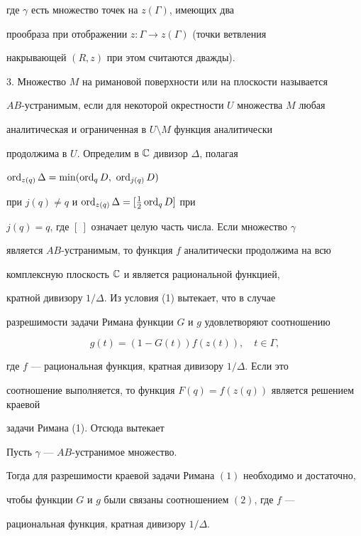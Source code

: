 где $\gamma$ есть множество точек на $z(\Gamma)$, имеющих два


прообраза при отображении $z: \Gamma \to z(\Gamma)$ (точки ветвления


накрывающей $(R, z)$ при этом считаются дважды).





3. Множество $M$ на римановой поверхности или на плоскости называется


$AB$-устранимым, если для некоторой окрестности $U$ множества $M$ любая


аналитическая и ограниченная в $U\setminus M$ функция аналитически


продолжима в $U$. Определим в $\Bbb C$ дивизор $\Delta$, полагая


$\ord_{z(q)}\Delta =\min (\ord_qD,\ \ord_{j(q)}D)$


при $j(q)\ne q$ и $\operatorname{ord}_{z(q)}\Delta =[\frac12\operatorname{ord}_qD]$ при


$j(q)=q$, где $[\ ]$ означает целую часть числа. Если множество $\gamma$


является $AB$-устранимым, то функция $f$ аналитически продолжима на всю


комплексную плоскость $\Bbb C$ и является рациональной функцией,


кратной дивизору $1/\Delta$. Из условия (1) вытекает, что в случае


разрешимости задачи Римана функции $G$ и $g$ удовлетворяют соотношению


\begin{equation}


g(t)=(1-G(t))f(z(t)),\quad t\in \Gamma,


\end{equation}


где $f$ --- рациональная функция, кратная дивизору $1/\Delta$. Если это


соотношение выполняется, то функция $F(q)=f(z(q))$ является решением краевой


задачи Римана (1). Отсюда вытекает





\begin{thm}


Пусть $\gamma$ --- $AB$-устранимое множество.


Тогда для разрешимости краевой задачи Римана $(1)$ необходимо и достаточно,


чтобы функции $G$ и $g$ были связаны соотношением $(2)$, где $f$ ---


рациональная функция, кратная дивизору $1/\Delta$.


\end{thm}





